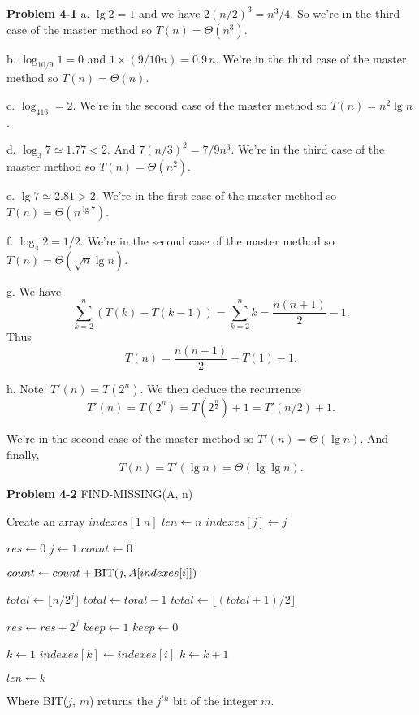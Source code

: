 \documentclass[a4paper,12pt]{article}
\newcommand{\newprob}[1]
{\bigskip \noindent \textbf{Problem #1} \newline}
\newcommand{\subpar}[1]{\medskip \noindent #1.}
\newcommand{\la}{\leftarrow}
\begin{document}
\newprob{4-1}
\subpar{a} $\lg 2 = 1$ and we have $2(n/2)^3 = n^3/4$.  So we're in
the third case of the master method so $T(n) = \Theta(n^3)$.

\subpar{b} $\log_{10/9}1 = 0$ and $1\times (9/10 n) = 0.9\,n$.  We're in
the third case of the master method so $T(n) = \Theta(n)$.

\subpar{c} $\log_416 = 2$.  We're in the second case of the master
method so $T(n) = n^2\lg n$.

\subpar{d} $\log_3 7 \simeq 1.77 < 2$. And $7(n/3)^2 = 7/9 n^3$.
We're in the third case of the master method so $T(n) = \Theta(n^2)$.

\subpar{e} $\lg 7 \simeq 2.81 > 2$.  We're in the first case of the
master method so $T(n) = \Theta(n^{\lg 7})$.

\subpar{f} $\log_4 2 = 1/2$.  We're in the second case of the master
method so $T(n) = \Theta(\sqrt{n}\lg n)$.

\subpar{g} We have
\[ \sum_{k=2}^n(T(k) - T(k-1)) = \sum_{k=2}^n k = \frac{n(n+1)}{2} -
1.\]
Thus
\[ T(n) = \frac{n(n+1)}{2} + T(1) - 1.\]

\subpar{h}  Note: $T'(n) = T(2^n)$.  We then deduce the recurrence
\[ T'(n) = T(2^n) = T(2^{\frac{n}{2}}) + 1 = T'(n/2) + 1.\]

We're in the second case of the master method so $T'(n) = \Theta(\lg
n)$.  And finally,
\[ T(n) = T'(\lg n) = \Theta(\lg \lg n).\]

\newpage
\newprob{4-2}
\textmd{FIND-MISSING(A, n)}
\begin{algorithmic}[1]
  \STATE Create an array $indexes[1\ n]$
  \STATE $len \la n$
  \FOR{$j \la 1$ to $len$}
  \STATE $indexes[j] \la j$
  \ENDFOR

  \STATE $res \la 0$
  \STATE $j \la 1$
  \STATE $count \la 0$
  
  \FOR{$i \la 1$ to $len$}
  \STATE $count \la count + \textmd{BIT}(j, A[indexes[i]])$
  \ENDFOR

  \STATE {}
  \STATE $total \la \lfloor n/2^j\rfloor$
  \STATE $total \la total - 1$
  \ENDIF
  \STATE $total \la \lfloor (total+1)/2\rfloor$

  \STATE {}
  \STATE $res \la res + 2^j$
  \STATE $keep \la 1$
  \ELSE
  \STATE $keep \la 0$
  \ENDIF

  \STATE $k \la 1$
  \FOR{$i \la 1$ to $len$}
  \STATE $indexes[k] \la indexes[i]$
  \STATE $k \la k+1$
  \ENDIF
  \ENDFOR

  \STATE $len \la k$
  \ENDWHILE

\end{algorithmic}
Where \textmd{BIT}($j$, $m$) returns the $j^{th}$ bit of the integer
$m$.
\end{document}
